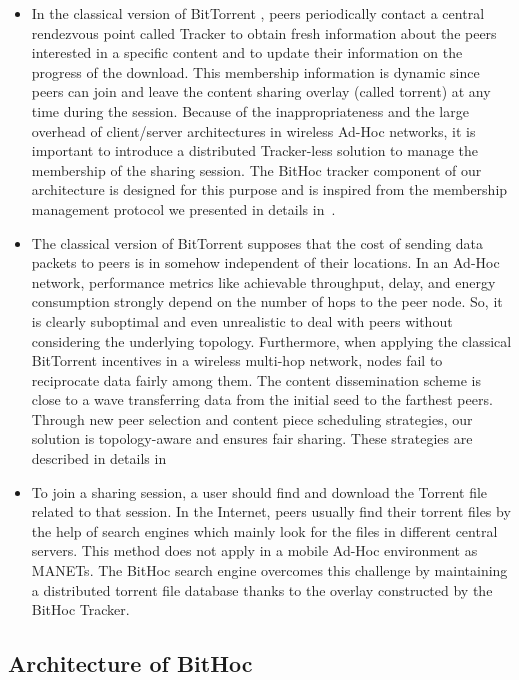 \begin{itemize}
\item{In the classical version of BitTorrent \cite{RefBT}, peers periodically contact a central rendezvous point called Tracker to obtain fresh information about the peers interested in a specific content and to update their information on the progress of the download. This membership information is dynamic since peers can join and leave the content sharing overlay (called torrent) at any time during the session. Because of the inappropriateness and the large overhead of client/server architectures in wireless Ad-Hoc networks, it is important to introduce a distributed Tracker-less solution to manage the membership of the sharing session. The BitHoc tracker component of our architecture is designed for this purpose and is inspired from the membership management protocol we presented in details in~\cite{BitHoc}.}
\item{The classical version of BitTorrent \cite{RefBT} supposes that the cost of sending data packets to peers is in somehow independent of their locations. In an Ad-Hoc network, performance metrics like achievable throughput, delay, and energy consumption strongly depend on the number of hops to the peer node. So, it is clearly suboptimal and even unrealistic to deal with peers without considering the underlying topology. Furthermore, when applying the classical BitTorrent incentives in a wireless multi-hop network, nodes fail to reciprocate data fairly among them. The content dissemination scheme is close to a wave transferring data from the initial seed to the farthest peers. Through new peer selection and content piece scheduling strategies, our solution is topology-aware and ensures fair sharing. These strategies are described in details in~\cite{BitHoc}}
\item{To join a sharing session, a user should find and download the Torrent file related to that session. In the Internet, peers usually find their torrent files by the help of search engines which mainly look for the files in different central servers. This method does not apply in a mobile Ad-Hoc environment as MANETs. The BitHoc search engine overcomes this challenge by maintaining a distributed torrent file database thanks to the overlay constructed by the BitHoc Tracker.}
\end{itemize}

\subsection{Architecture of BitHoc}
\label{secarchitecture}

